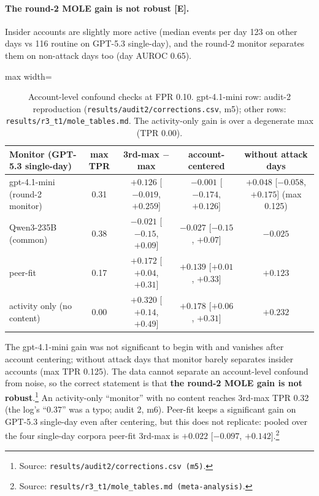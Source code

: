 \documentclass[11pt]{article}
\newcommand{\m}{\ensuremath{-}}
\newcommand{\src}[1]{\footnote{Source: \nolinkurl{#1}.}}
\newcommand{\tE}{\textsf{\scriptsize\textcolor{ink2}{[E]}}\xspace}
\begin{document}
\paragraph{The round-2 MOLE gain is not robust \tE.} Insider accounts are slightly more active (median events per day 123 on other days vs 116 routine on GPT-5.3 single-day), and the round-2 monitor separates them on non-attack days too (day AUROC 0.65).

\begin{table}[!htbp]\centering\small
\begin{adjustbox}{max width=\linewidth}\begin{tabular}{@{}lcccc@{}}
\toprule
Monitor (GPT-5.3 single-day) & max TPR & 3rd-max $-$ max & account-centered & without attack days\\
\midrule
gpt-4.1-mini (round-2 monitor) & 0.31 & $+0.126$ [$\m0.019$, $+0.259$] & $\m0.001$ [$\m0.174$, $+0.126$] & $+0.048$ [$\m0.058$, $+0.175$] (max 0.125)\\
Qwen3-235B (common) & 0.38 & $\m0.021$ [$\m0.15$, $+0.09$] & $\m0.027$ [$\m0.15$, $+0.07$] & $\m0.025$\\
peer-fit & 0.17 & $+0.172$ [$+0.04$, $+0.31$] & $+0.139$ [$+0.01$, $+0.33$] & $+0.123$\\
activity only (no content) & 0.00 & $+0.320$ [$+0.14$, $+0.49$] & $+0.178$ [$+0.06$, $+0.31$] & $+0.232$\\
\bottomrule
\end{tabular}\end{adjustbox}
\caption{Account-level confound checks at FPR 0.10. gpt-4.1-mini row: audit-2 reproduction (\nolinkurl{results/audit2/corrections.csv}, m5); other rows: \nolinkurl{results/r3_t1/mole_tables.md}. The activity-only gain is over a degenerate max (TPR 0.00).}\label{tab:moleconf}
\end{table}

The gpt-4.1-mini gain was not significant to begin with and vanishes after account centering; without attack days that monitor barely separates insider accounts (max TPR 0.125). The data cannot separate an account-level confound from noise, so the correct statement is that \textbf{the round-2 MOLE gain is not robust}.\src{results/audit2/corrections.csv (m5)} An activity-only ``monitor'' with no content reaches 3rd-max TPR 0.32 (the log's ``0.37'' was a typo; audit 2, m6). Peer-fit keeps a significant gain on GPT-5.3 single-day even after centering, but this does not replicate: pooled over the four single-day corpora peer-fit 3rd-max is $+0.022$ [$\m0.097$, $+0.142$].\src{results/r3_t1/mole_tables.md (meta-analysis)}
\end{document}
